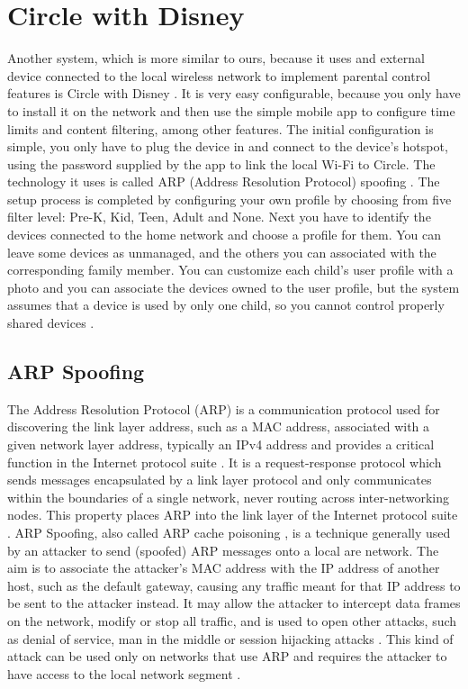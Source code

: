 \section{Circle with Disney}

Another system, which is more similar to ours, because it uses and external device connected to the local wireless network to implement parental control features is Circle with Disney \citep{circleWithDisney}. It is very easy configurable, because you only have to install it on the network and then use the simple mobile app to configure time limits and content filtering, among other features. The initial configuration is simple, you only have to plug the device in and connect to the device's hotspot, using the password supplied by the app to link the local Wi-Fi to Circle. The technology it uses is called ARP (Address Resolution Protocol) spoofing \citep{braden1989rfc}. The setup process is completed by configuring your own profile by choosing from five filter level: Pre-K, Kid, Teen, Adult and None. Next you have to identify the devices connected to the home network and choose a profile for them. You can leave some devices as unmanaged, and the others you can associated with the corresponding family member. You can customize each child's user profile with a photo and you can associate the devices owned to the user profile, but the system assumes that a device is used by only one child, so you cannot control properly shared devices \citep{circlePCMag}.

\subsection{ARP Spoofing}

The Address Resolution Protocol (ARP) is a communication protocol used for discovering the link layer address, such as a MAC address, associated with a given network layer address, typically an IPv4 address and provides a critical function in the Internet protocol suite \citep{plummer1982ethernet}. It is a request-response protocol which sends messages encapsulated by a link layer protocol and only communicates within the boundaries of a single network, never routing across inter-networking nodes. This property places ARP into the link layer of the Internet protocol suite \citep{braden1989rfc}. ARP Spoofing, also called ARP cache poisoning \citep{lockhart2004network}, is a technique generally used by an attacker to send (spoofed) ARP messages onto a local are network. The aim is to associate the attacker's MAC address with the IP address of another host, such as the default gateway, causing any traffic meant for that IP address to be sent to the attacker instead. It may allow the attacker to intercept data frames on the network, modify or stop all traffic, and is used to open other attacks, such as denial of service, man in the middle or session hijacking attacks \citep{ramachandran2005detecting}. This kind of attack can be used only on networks that use ARP and requires the attacker to have access to the local network segment \citep{lockhart2004network}.

